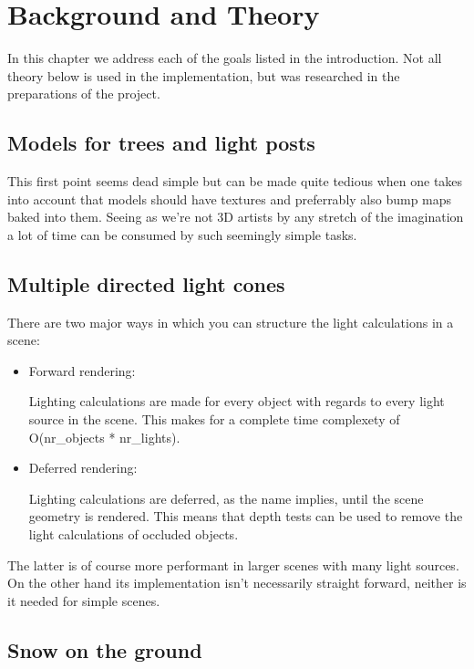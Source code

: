 \documentclass[a4paper,12pt]{article}
\begin{document}
\section{Background and Theory}

In this chapter we address each of the goals listed in the introduction. Not all theory below is used in the implementation, but was researched in the preparations of the project.


\subsection{Models for trees and light posts}

This first point seems dead simple but can be made quite tedious when one takes into account that models should have textures and preferrably also bump maps baked into them. Seeing as we're not 3D artists by any stretch of the imagination a lot of time can be consumed by such seemingly simple tasks.


\subsection{Multiple directed light cones}

There are two major ways in which you can structure the light calculations in a scene:

\begin{itemize}
\item Forward rendering:

  Lighting calculations are made for every object with regards to every light source in the scene. This makes for a complete time complexety of O(nr\_objects * nr\_lights).

\item Deferred rendering:

  Lighting calculations are deferred, as the name implies, until the scene geometry is rendered. This means that depth tests can be used to remove the light calculations of occluded objects.
\end{itemize}

\noindent
The latter is of course more performant in larger scenes with many light sources. On the other hand its implementation isn't necessarily straight forward, neither is it needed for simple scenes.


\subsection{Snow on the ground}
\end{document}
